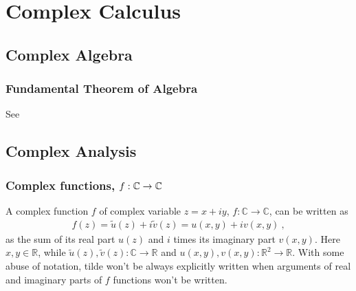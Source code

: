 \documentclass[letterpaper,10pt,english]{jupyterBook}
\begin{document}
\part{Complex Calculus}

\sphinxstepscope


\chapter{Complex Algebra}
\label{\detokenize{ch/complex/algebra:complex-algebra}}\label{\detokenize{ch/complex/algebra:id1}}\label{\detokenize{ch/complex/algebra::doc}}

\section{Fundamental Theorem of Algebra}
\label{\detokenize{ch/complex/algebra:fundamental-theorem-of-algebra}}\label{\detokenize{ch/complex/algebra:complex-algebra-fundamental-theorem}}
\sphinxAtStartPar
See 

\sphinxstepscope


\chapter{Complex Analysis}
\label{\detokenize{ch/complex/analysis:complex-analysis}}\label{\detokenize{ch/complex/analysis:id1}}\label{\detokenize{ch/complex/analysis::doc}}

\section{Complex functions, \protect\(f: \mathbb{C} \rightarrow \mathbb{C}\protect\)}
\label{\detokenize{ch/complex/analysis:complex-functions-f-mathbb-c-rightarrow-mathbb-c}}\label{\detokenize{ch/complex/analysis:complex-analysis-fun}}
\sphinxAtStartPar
A complex function \(f\) of complex variable \(z = x + i y\), \(f: \mathbb{C} \rightarrow \mathbb{C}\), can be written as
\begin{equation*}
\begin{split}f(z) = \tilde{u}(z) + i \tilde{v}(z) = u(x,y) + i v(x,y) \ ,\end{split}
\end{equation*}
\sphinxAtStartPar
as the sum of its real part \(u(z)\) and \(i\) times its imaginary part \(v(x,y)\). Here \(x,y \in \mathbb{R}\), while \(\tilde{u}(z), \tilde{v}(z): \mathbb{C} \rightarrow \mathbb{R}\) and \(u(x,y), v(x,y): \mathbb{R}^2 \rightarrow \mathbb{R}\). With some abuse of notation, tilde won’t be always explicitly written when arguments of real and imaginary parts of \(f\) functions won’t be written.
\end{document}
